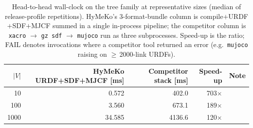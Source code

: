 \begin{table}[t]
\centering
\caption{Head-to-head wall-clock on the \textsf{tree} family at representative sizes (median of release-profile repetitions). HyMeKo's 3-format-bundle column is compile$+$URDF$+$SDF$+$MJCF summed in a single in-process pipeline; the competitor column is \texttt{xacro} $\to$ \texttt{gz sdf} $\to$ \texttt{mujoco} run as three subprocesses. Speed-up is the ratio; FAIL denotes invocations where a competitor tool returned an error (e.g.\ \texttt{mujoco} raising on $\ge$\,2000-link URDFs).}
\label{tab:head_to_head}
\begin{tabular}{rrrrr}
\toprule
$|V|$ & HyMeKo URDF+SDF+MJCF [ms] & Competitor stack [ms] & Speed-up & Note \\
\midrule
10 & 0.572 & 402.0 & 703$\times$ &  \\
100 & 3.560 & 673.1 & 189$\times$ &  \\
1000 & 34.585 & 4136.6 & 120$\times$ &  \\
\bottomrule
\end{tabular}
\end{table}